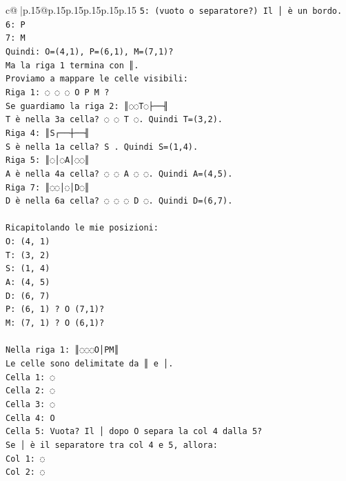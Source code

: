 \documentclass{article}
\begin{document}
{\begin{supertabular}{c@{$\;$}|p{.15\linewidth}@{}p{.15\linewidth}p{.15\linewidth}p{.15\linewidth}p{.15\linewidth}p{.15\linewidth}}
{{{\texttt{5: (vuoto o separatore?) Il │ è un bordo.} \\
\texttt{6: P} \\
\texttt{7: M} \\
\texttt{Quindi: O=(4,1), P=(6,1), M=(7,1)?} \\
\texttt{Ma la riga 1 termina con ║.} \\
\texttt{Proviamo a mappare le celle visibili:} \\
\texttt{Riga 1: ◌ ◌ ◌ O   P M ?} \\
\texttt{Se guardiamo la riga 2: ║◌◌T◌├──╢} \\
\texttt{T è nella 3a cella? ◌ ◌ T ◌. Quindi T=(3,2).} \\
\texttt{Riga 4: ║S┌──┼──╢} \\
\texttt{S è nella 1a cella? S      . Quindi S=(1,4).} \\
\texttt{Riga 5: ║◌│◌A│◌◌║} \\
\texttt{A è nella 4a cella? ◌   ◌ A   ◌ ◌. Quindi A=(4,5).} \\
\texttt{Riga 7: ║◌◌│◌│D◌║} \\
\texttt{D è nella 6a cella? ◌ ◌   ◌   D ◌. Quindi D=(6,7).} \\
\\ 
\texttt{Ricapitolando le mie posizioni:} \\
\texttt{O: (4, 1)} \\
\texttt{T: (3, 2)} \\
\texttt{S: (1, 4)} \\
\texttt{A: (4, 5)} \\
\texttt{D: (6, 7)} \\
\texttt{P: (6, 1) ? O (7,1)?} \\
\texttt{M: (7, 1) ? O (6,1)?} \\
\\ 
\texttt{Nella riga 1: ║◌◌◌O│PM║} \\
\texttt{Le celle sono delimitate da ║ e │.} \\
\texttt{Cella 1: ◌} \\
\texttt{Cella 2: ◌} \\
\texttt{Cella 3: ◌} \\
\texttt{Cella 4: O} \\
\texttt{Cella 5: Vuota? Il │ dopo O separa la col 4 dalla 5?} \\
\texttt{Se │ è il separatore tra col 4 e 5, allora:} \\
\texttt{Col 1: ◌} \\
\texttt{Col 2: ◌} \\
}}}
\end{supertabular}}
\end{document}
